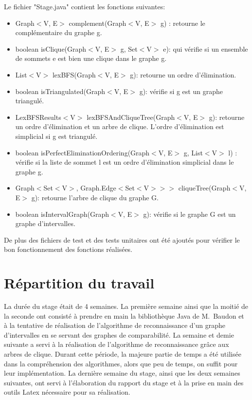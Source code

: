 \documentclass[12pt, a4paper]{report}
\begin{document}
 	Le fichier "Stage.java" contient les fonctions suivantes:
 	\begin{itemize}
 	\item Graph$<$V, E$>$ complement(Graph$<$V, E$>$ g) : retourne le complémentaire du graphe g.\\
 	\item boolean isClique(Graph$<$V, E$>$ g, Set$<$V$>$ e): qui vérifie si un ensemble de sommets e est bien une clique dans le graphe g.\\
 	\item List$<$V$>$ lexBFS(Graph$<$V, E$>$ g): retourne un ordre d'élimination.\\
 	\item boolean isTriangulated(Graph$<$V, E$>$ g): vérifie si g est un graphe triangulé.\\
 	\item LexBFSResults$<$V$>$ lexBFSAndCliqueTree(Graph$<$V, E$>$ g): retourne un ordre d'élimination et un arbre de clique. L'ordre d'élimination est simplicial si g est triangulé.\\
 	\item  boolean isPerfectEliminationOrdering(Graph$<$V, E$>$ g, List$<$V$>$ l) : vérifie si la liste de sommet l est un ordre d'élimination simplicial dans le graphe g.\\
 	\item  Graph$<$Set$<$V$>$, Graph.Edge$<$Set$<$V$>>>$ cliqueTree(Graph$<$V, E$>$ g): retourne l'arbre de clique du graphe G.\\
 	\item boolean isIntervalGraph(Graph$<$V, E$>$ g): vérifie si le graphe G est un graphe d'intervalles.\\
 	\end{itemize}
 	
 	De plus des fichiers de test et des tests unitaires ont été ajoutés pour vérifier le bon fonctionnement des fonctions réalisées.
 	
 	\section{Répartition du travail}
	La durée du stage était de 4 semaines. La première semaine ainsi que la moitié de la seconde ont consisté à prendre en main la bibliothèque Java de M.~Baudon et à la tentative de réalisation de l'algorithme de reconnaissance d'un graphe d'intervalles en se servant des graphes de comparabilité. La semaine et demie suivante a servi à la réalisation de l'algorithme de reconnaissance grâce aux arbres de clique. Durant cette période, la majeure partie de temps a été utilisée dans la compréhension des algorithmes, alors que peu de temps, on suffit pour leur implémentation. 
La dernière semaine du stage, ainsi que les deux semaines suivantes, ont servi à l'élaboration du rapport du stage et à la prise en main des outils Latex nécessaire pour sa réalisation.
\end{document}
